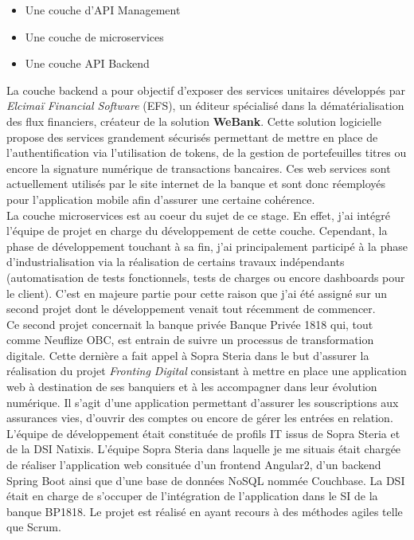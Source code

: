 \begin{itemize}
	\item Une couche d'API Management
	\item Une couche de microservices
	\item Une couche API Backend \\
\end{itemize} 

	La couche backend a pour objectif d'exposer des services unitaires développés par \textit{Elcimaï Financial Software} (EFS), un éditeur spécialisé dans la dématérialisation des flux financiers, créateur de la solution \textbf{WeBank}. Cette solution logicielle propose des services grandement sécurisés permettant de mettre en place de l'authentification via l'utilisation de tokens, de la gestion de portefeuilles titres ou encore la signature numérique de transactions bancaires. Ces web services sont actuellement utilisés par le site internet de la banque et sont donc réemployés pour l'application mobile afin d'assurer une certaine cohérence. \\

	La couche microservices est au coeur du sujet de ce stage. En effet, j'ai intégré l'équipe de projet en charge du développement de cette couche. Cependant, la phase de développement touchant à sa fin, j'ai principalement participé à la phase d'industrialisation via la réalisation de certains travaux indépendants (automatisation de tests fonctionnels, tests de charges ou encore dashboards pour le client). C'est en majeure partie pour cette raison que j'ai été assigné sur un second projet dont le développement venait tout récemment de commencer. \\
	
	Ce second projet concernait la banque privée Banque Privée 1818 qui, tout comme Neuflize OBC, est entrain de suivre un processus de transformation digitale. Cette dernière a fait appel à Sopra Steria dans le but d'assurer la réalisation du projet \textit{Fronting Digital} consistant à mettre en place une application web à destination de ses banquiers et à les accompagner dans leur évolution numérique. Il s'agit d'une application permettant d'assurer les souscriptions aux assurances vies, d'ouvrir des comptes ou encore de gérer les entrées en relation. \\
	
	L'équipe de développement était constituée de profils IT issus de Sopra Steria et de la DSI Natixis. L'équipe Sopra Steria dans laquelle je me situais était chargée de réaliser l'application web consituée d'un frontend Angular2, d'un backend Spring Boot ainsi que d'une base de données NoSQL nommée Couchbase. La DSI était en charge de s'occuper de l'intégration de l'application dans le SI de la banque BP1818. Le projet est réalisé en ayant recours à des méthodes agiles telle que Scrum.